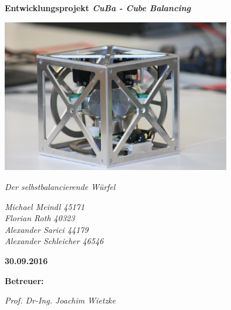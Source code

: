 
\begin{titlepage}

\begin{center}
  \bfseries
  \large Entwicklungsprojekt
  \vskip1.5cm
  \emph{\huge CuBa - Cube Balancing\\}
  \vskip1cm
  \begin{center}
  \includegraphics[width=0.75\textwidth]{img/3D_Modell_img.JPG}
  \end{center}
  \emph{\normalsize Der selbstbalancierende Würfel}
\end{center}
\vskip1cm

\begin{center}
	\bfseries\large \par \emph{	Michael Meindl			45171	\\
								Florian Roth			40323	\\
								Alexander Sarici		44179	\\
								Alexander Schleicher	46546}
\end{center}

\vskip1cm
\centering
\bfseries 
\normalsize 30.09.2016
\vskip1cm
\begin{center}
	\bfseries
	\normalsize Betreuer:\par \emph{Prof. Dr-Ing. Joachim Wietzke}
\end{center}
\end{titlepage}
